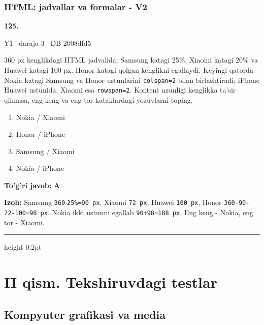 \documentclass[10pt,a4paper,oneside]{article}
\begin{document}
\subsubsection{HTML: jadvallar va formalar - V2}
\hypertarget{q125}{\textbf{\color{ink}125.}}  {\color{muted}\scriptsize Y1 \textbullet\ daraja 3 \textbullet\ DB 2008dfd5}
\par
360 px kenglikdagi HTML jadvalida: Samsung katagi 25\%, Xiaomi katagi 20\% va Huawei katagi 100 px. Honor katagi qolgan kenglikni egallaydi. Keyingi qatorda Nokia katagi Samsung va Honor ustunlarini \texttt{colspan=2} bilan birlashtiradi; iPhone Huawei ustunida, Xiaomi esa \texttt{rowspan=2}. Kontent uzunligi kenglikka ta'sir qilmasa, eng keng va eng tor kataklardagi yozuvlarni toping.
\begin{enumerate}[label=\Alph*),leftmargin=9mm]
\item Nokia / Xiaomi
\item Honor / iPhone
\item Samsung / Xiaomi
\item Nokia / iPhone
\end{enumerate}
\begin{tcolorbox}[enhanced,breakable,colback=teal!4,colframe=teal!45!black,boxrule=0.45pt,arc=1.2mm,left=2.8mm,right=2.8mm,top=2mm,bottom=2mm,before skip=2mm,after skip=2mm]
\textbf{\color{teal}To'g'ri javob:} \textbf{A}
\par\smallskip
\textbf{Izoh:} Samsung \texttt{360\(\cdot\)25\%=90 px}, Xiaomi \texttt{72 px}, Huawei \texttt{100 px}, Honor \texttt{360-90-72-100=98 px}. Nokia ikki ustunni egallab \texttt{90+98=188 px}. Eng keng - Nokia, eng tor - Xiaomi.
\end{tcolorbox}
\vspace{2mm}\hrule height 0.2pt \vspace{4mm}
\section{II qism. Tekshiruvdagi testlar}
\subsection{Kompyuter grafikasi va media}
\end{document}
